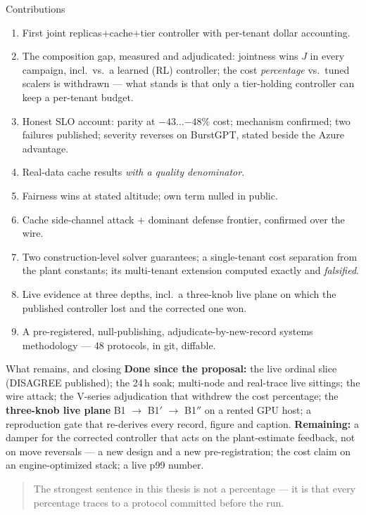 \documentclass[aspectratio=169,11pt]{beamer}
\begin{document}
\begin{frame}{Contributions}
  \begin{enumerate}
    \item First joint replicas$+$cache$+$tier controller with per-tenant
          dollar accounting.
    \item The composition gap, measured and adjudicated: jointness wins
          $J$ in every campaign, incl.\ vs.\ a learned (RL) controller; the
          cost \emph{percentage} vs.\ tuned scalers is withdrawn --- what
          stands is that only a tier-holding controller can keep a
          per-tenant budget.
    \item Honest SLO account: parity at $-43\ldots{-48\%}$ cost; mechanism
          confirmed; two failures published; severity reverses on BurstGPT,
          stated beside the Azure advantage.
    \item Real-data cache results \emph{with a quality denominator}.
    \item Fairness wins at stated altitude; own term nulled in public.
    \item Cache side-channel attack $+$ dominant defense frontier,
          confirmed over the wire.
    \item Two construction-level solver guarantees; a single-tenant cost
          separation from the plant constants; its multi-tenant extension
          computed exactly and \emph{falsified}.
    \item Live evidence at three depths, incl.\ a three-knob live plane on
          which the published controller lost and the corrected one won.
    \item A pre-registered, null-publishing, adjudicate-by-new-record
          systems methodology --- 48 protocols, in git, diffable.
  \end{enumerate}
\end{frame}

\begin{frame}{What remains, and closing}
  \textbf{Done since the proposal:} the live ordinal slice (DISAGREE
  published); the 24\,h soak; multi-node and real-trace live sittings; the
  wire attack; the V-series adjudication that withdrew the cost percentage;
  the \textbf{three-knob live plane} B1 $\to$ B1$'$ $\to$ B1$''$ on a
  rented GPU host; a reproduction gate that re-derives every record, figure
  and caption.
  \vfill
  \textbf{Remaining:} a damper for the corrected controller that acts on
  the plant-estimate feedback, not on move reversals --- a new design and a
  new pre-registration; the cost claim on an engine-optimized stack; a live
  p99 number.
  \vfill
  \begin{quote}
    The strongest sentence in this thesis is not a percentage --- it is
    that every percentage traces to a protocol committed before the run.
  \end{quote}
\end{frame}
\end{document}
